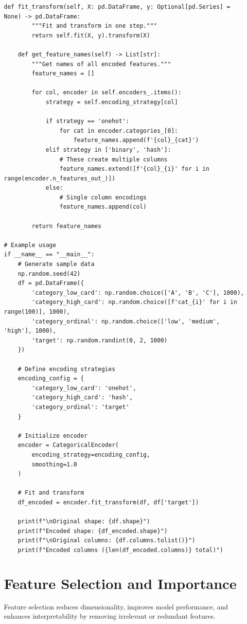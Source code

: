 \begin{lstlisting}[style=python, caption={Comprehensive Categorical Encoding Framework}]
    def fit_transform(self, X: pd.DataFrame, y: Optional[pd.Series] = None) -> pd.DataFrame:
        """Fit and transform in one step."""
        return self.fit(X, y).transform(X)

    def get_feature_names(self) -> List[str]:
        """Get names of all encoded features."""
        feature_names = []

        for col, encoder in self.encoders_.items():
            strategy = self.encoding_strategy[col]

            if strategy == 'onehot':
                for cat in encoder.categories_[0]:
                    feature_names.append(f'{col}_{cat}')
            elif strategy in ['binary', 'hash']:
                # These create multiple columns
                feature_names.extend([f'{col}_{i}' for i in range(encoder.n_features_out_)])
            else:
                # Single column encodings
                feature_names.append(col)

        return feature_names

# Example usage
if __name__ == "__main__":
    # Generate sample data
    np.random.seed(42)
    df = pd.DataFrame({
        'category_low_card': np.random.choice(['A', 'B', 'C'], 1000),
        'category_high_card': np.random.choice([f'cat_{i}' for i in range(100)], 1000),
        'category_ordinal': np.random.choice(['low', 'medium', 'high'], 1000),
        'target': np.random.randint(0, 2, 1000)
    })

    # Define encoding strategies
    encoding_config = {
        'category_low_card': 'onehot',
        'category_high_card': 'hash',
        'category_ordinal': 'target'
    }

    # Initialize encoder
    encoder = CategoricalEncoder(
        encoding_strategy=encoding_config,
        smoothing=1.0
    )

    # Fit and transform
    df_encoded = encoder.fit_transform(df, df['target'])

    print(f"\nOriginal shape: {df.shape}")
    print(f"Encoded shape: {df_encoded.shape}")
    print(f"\nOriginal columns: {df.columns.tolist()}")
    print(f"Encoded columns ({len(df_encoded.columns)} total)")
\end{lstlisting}

\section{Feature Selection and Importance}

Feature selection reduces dimensionality, improves model performance, and enhances interpretability by removing irrelevant or redundant features.

